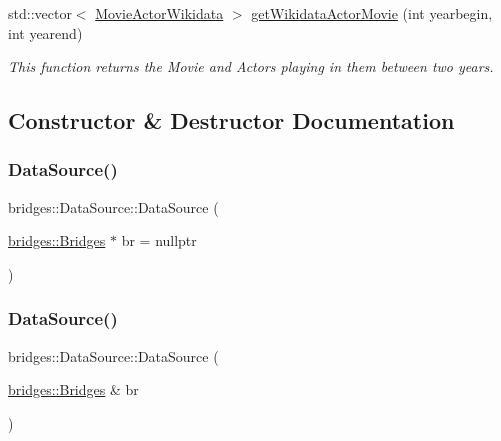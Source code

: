 \begin{DoxyCompactItemize}
\item 
std\+::vector$<$ \mbox{\hyperlink{classbridges_1_1dataset_1_1_movie_actor_wikidata}{Movie\+Actor\+Wikidata}} $>$ \mbox{\hyperlink{classbridges_1_1_data_source_a25b33736b4ae9ffea5fe4ebf5dbb3a63}{get\+Wikidata\+Actor\+Movie}} (int yearbegin, int yearend)
\begin{DoxyCompactList}\small\item\em This function returns the Movie and Actors playing in them between two years. \end{DoxyCompactList}\end{DoxyCompactItemize}


\subsection{Constructor \& Destructor Documentation}
\mbox{\label{classbridges_1_1_data_source_afc95b52d2ca03a92c1f1ee1594a097c7}} 
\subsubsection{\texorpdfstring{DataSource()}{DataSource()}\hspace{0.1cm}{\footnotesize\ttfamily [1/2]}}
{\footnotesize\ttfamily bridges\+::\+Data\+Source\+::\+Data\+Source (\begin{DoxyParamCaption}\item[{\mbox{\hyperlink{classbridges_1_1_bridges}{bridges\+::\+Bridges}} $\ast$}]{br = {\ttfamily nullptr} }\end{DoxyParamCaption})\hspace{0.3cm}{\ttfamily [inline]}}

\mbox{\label{classbridges_1_1_data_source_a0da0dc59d798aa3266df7931a396a4c9}} 
\subsubsection{\texorpdfstring{DataSource()}{DataSource()}\hspace{0.1cm}{\footnotesize\ttfamily [2/2]}}
{\footnotesize\ttfamily bridges\+::\+Data\+Source\+::\+Data\+Source (\begin{DoxyParamCaption}\item[{\mbox{\hyperlink{classbridges_1_1_bridges}{bridges\+::\+Bridges}} \&}]{br }\end{DoxyParamCaption})\hspace{0.3cm}{\ttfamily [inline]}}



